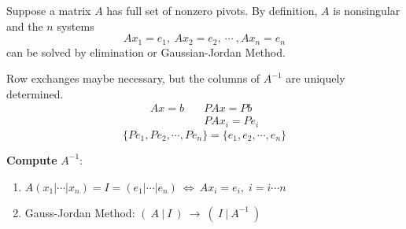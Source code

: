\vspace{2em}

Suppose a matrix $A$ has full set of nonzero pivots. By definition, $A$ is nonsingular and the $n$ systems \[
    Ax_1 = e_1, \ Ax_2 = e_2,\ \cdots\ , Ax_n = e_n
\]
can be solved by elimination or Gaussian-Jordan Method.
\vspace{1em}

Row exchanges maybe necessary, but the columns of $A^{-1}$ are uniquely determined.
\begin{align*}
    Ax = b \quad &PAx = Pb \\
                &PAx_i = Pe_i
\end{align*}
\[
\{ Pe_1, Pe_2, \cdots, Pe_n\} = \{ e_1, e_2, \cdots, e_n\} 
\]

\begin{note}
    \textbf{Compute} $A^{-1}$: 
    \begin{enumerate}[$\arabic*^\circ$]
        \item $A(x_1|\cdots|x_n) = I = (e_1|\cdots|e_n) \ \Longleftrightarrow \ Ax_i = e_i, \; i=i\cdots n$
        \item Gauss-Jordan Method: $(\ A\ |\ I\ ) \ \longrightarrow \ (\ I\ |\ A^{-1}\ )$
    \end{enumerate}
\end{note}

